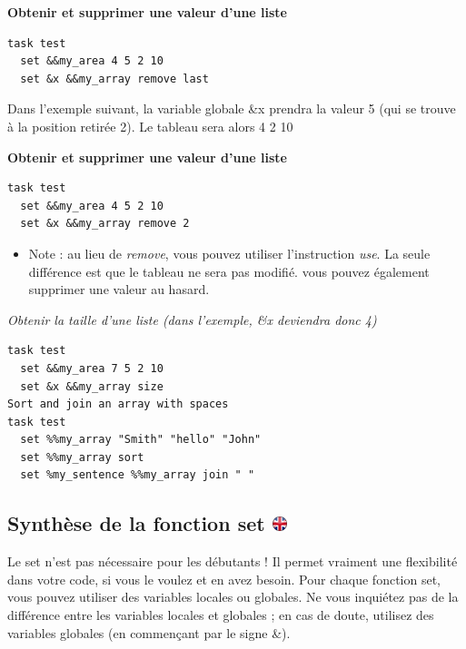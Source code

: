 \documentclass[
]{book}
\providecommand{\tightlist}{%
  \setlength{\itemsep}{0pt}\setlength{\parskip}{0pt}}
\begin{document}
\textbf{Obtenir et supprimer une valeur d'une liste}

\begin{verbatim}
task test
  set &&my_area 4 5 2 10
  set &x &&my_array remove last
\end{verbatim}

Dans l'exemple suivant, la variable globale \&x prendra la valeur 5 (qui se trouve à la position retirée 2). Le tableau sera alors 4 2 10

\textbf{Obtenir et supprimer une valeur d'une liste}

\begin{verbatim}
task test
  set &&my_area 4 5 2 10
  set &x &&my_array remove 2
\end{verbatim}

\begin{itemize}
\tightlist
\item
  Note : au lieu de \emph{remove}, vous pouvez utiliser l'instruction \emph{use}. La seule différence est que le tableau ne sera pas modifié. vous pouvez également supprimer une valeur au hasard.
\end{itemize}

\emph{Obtenir la taille d'une liste (dans l'exemple, \&x deviendra donc 4)}

\begin{verbatim}
task test
  set &&my_area 7 5 2 10
  set &x &&my_array size
Sort and join an array with spaces
task test
  set %%my_array "Smith" "hello" "John"
  set %%my_array sort
  set %my_sentence %%my_array join " "
\end{verbatim}

\hypertarget{synthuxe8se-de-la-fonction-set}{%
\subsection[Synthèse de la fonction set ]{\texorpdfstring{Synthèse de la fonction set \href{https://www.psytoolkit.org/doc3.4.0/syntax.html\#_summary_of_set}{\protect\includegraphics{img/ukflag.png}}}{Synthèse de la fonction set }}\label{synthuxe8se-de-la-fonction-set}}

Le set n'est pas nécessaire pour les débutants ! Il permet vraiment une flexibilité dans votre code, si vous le voulez et en avez besoin.
Pour chaque fonction set, vous pouvez utiliser des variables locales ou globales. Ne vous inquiétez pas de la différence entre les variables locales et globales ; en cas de doute, utilisez des variables globales (en commençant par le signe \&).
\end{document}
